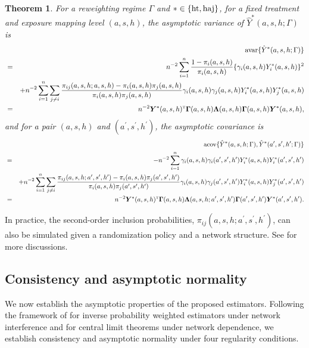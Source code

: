 \documentclass{article}
\newtheorem{theorem}{Theorem}[section]
\def\T{{\textsc{t}}}
\newcommand{\avar}{\textup{avar}}
\newcommand{\acov}{\textup{acov}}
\newcommand{\bY}{\boldsymbol{Y}}
\newcommand{\bLambda}{\boldsymbol{\Lambda}}
\newcommand{\bGamma}{\boldsymbol{\Gamma}}
\newcommand{\sumi}{\sum_{i=1}^n}
\newcommand{\sumjneqi}{\sum_{j\neq i}}
\newcommand{\horthom}{\textup{ht}}
\newcommand{\haj}{\textup{haj}}
\newcommand{\ashprime}{a^{\prime},s^{\prime},h^{\prime}}
\newcommand{\pscore}[1]{\pi_{#1}}
\begin{document}
\begin{theorem}\label{thm:asym_var}
For a reweighting regime $\Gamma$ and $*\in\{\horthom,\haj\}$, for a fixed treatment and exposure mapping level $(a,s,h)$, the asymptotic variance of $\hat{Y}^{*}(a,s,h;\Gamma)$ is
\begin{eqnarray*}
    && \avar\{\hat{Y}^{*}(a,s,h;\Gamma)\} \\
    &=& n^{-2}\sumi \frac{1 - \pscore{i}(a, s, h)}{\pscore{i}(a, s, h)}\{\gamma_i(a,s,h)Y_i^{*}(a, s, h)\}^2 \\
    &&+ n^{-2}\sumi\sumjneqi\frac{\pscore{ij}(a, s, h; a, s, h) - \pscore{i}(a, s, h)\pscore{j}(a, s, h)}{\pscore{i}(a, s, h)\pscore{j}(a, s, h)}\gamma_i(a,s,h)\gamma_j(a,s,h)Y_i^{*}(a, s, h)Y_j^{*}(a, s, h) \\
    &=& n^{-2} \bY^{*}(a,s,h)^{\T} \bGamma(a,s,h) \bLambda(a,s,h) \bGamma(a,s,h) \bY^{*}(a,s,h), 
\end{eqnarray*}
and for a pair $(a,s,h)$ and $(a^{\prime},s^{\prime},h^{\prime})$, the asymptotic covariance is
\begin{eqnarray*}
    && \acov\{\hat{Y}^{*}(a,s,h;\Gamma), \hat{Y}^{*}(a',s',h';\Gamma)\} \\
    &=& -n^{-2}\sumi  \gamma_i(a,s,h)\gamma_i(\ashprime) Y_i^*(a, s, h) Y_i^*(\ashprime) \\ 
    &&+ n^{-2}\sumi\sumjneqi \frac{\pscore{ij}(a, s, h; \ashprime) - \pscore{i}(a, s, h)\pscore{j}(\ashprime)}{\pscore{i}(a, s, h)\pscore{j}(\ashprime)} \gamma_i(a,s,h)\gamma_j(\ashprime)Y_i^*(a, s, h) Y_j^*(\ashprime) \\
    &=& n^{-2} \bY^*(a,s,h)^{\T} \bGamma(a,s,h)\bLambda(a,s,h;\ashprime) \bGamma(a',s',h')\bY^*(\ashprime).
\end{eqnarray*}
\end{theorem}

In practice, the second-order inclusion probabilities, $ \pi_{ij}(a,s,h;\ashprime) $, can also be simulated given a randomization policy and a network structure. See \cite{aronow2017estimating} for more discussions. 

\subsection{Consistency and asymptotic normality}

We now establish the asymptotic properties of the proposed estimators. Following the framework of \citet{aronow2017estimating} for inverse probability weighted estimators under network interference and \citet{chen2004normal} for central limit theorems under network dependence, we establish consistency and asymptotic normality under four regularity conditions.
\end{document}
